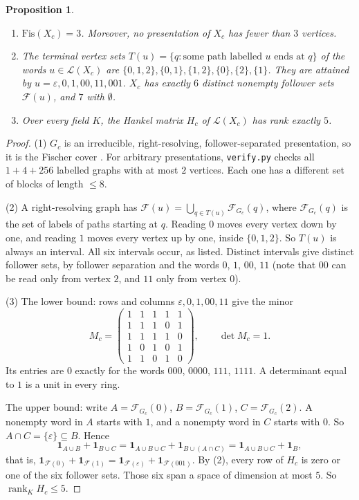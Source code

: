 \documentclass[11pt]{article}
\newtheorem{proposition}[theorem]{Proposition}
\theoremstyle{definition}
\theoremstyle{remark}
\newcommand{\Lang}{\mathcal{L}}
\newcommand{\F}{\mathcal{F}}
\begin{document}
\begin{proposition}\label{prop:charge}
\begin{enumerate}
\item $\mathrm{Fis}(X_c)=3$. Moreover, no presentation of $X_c$ has fewer than $3$ vertices.
\item The terminal vertex sets $T(u)=\{q: \text{some path labelled } u \text{ ends at } q\}$
of the words $u\in\Lang(X_c)$ are
$\{0,1,2\},\{0,1\},\{1,2\},\{0\},\{2\},\{1\}$. They are attained by
$u=\varepsilon,0,1,00,11,001$. $X_c$ has exactly $6$ distinct nonempty follower sets
$\F(u)$, and $7$ with $\emptyset$.
\item Over every field $K$, the Hankel matrix $H_c$ of $\Lang(X_c)$ has rank exactly $5$.
\end{enumerate}
\end{proposition}
\begin{proof}
(1) $G_c$ is an irreducible, right-resolving, follower-separated presentation,
so it is the Fischer cover \cite[\S3.3]{lm}. For arbitrary presentations,
\texttt{verify.py} checks all $1+4+256$ labelled graphs with at most $2$ vertices.
Each one has a different set of blocks of length $\le 8$.

(2) A right-resolving graph has $\F(u)=\bigcup_{q\in T(u)}\F_{G_c}(q)$, where
$\F_{G_c}(q)$ is the set of labels of paths starting at $q$. Reading $0$ moves every
vertex down by one, and reading $1$ moves every vertex up by one, inside $\{0,1,2\}$.
So $T(u)$ is always an interval. All six intervals occur, as listed. Distinct
intervals give distinct follower sets, by follower separation and the words $0$, $1$, $00$, $11$ (note that $00$ can be read only from vertex $2$, and $11$ only from vertex $0$).

(3) The lower bound: rows and columns $\varepsilon,0,1,00,11$ give the minor
\[
M_c=\begin{pmatrix}1&1&1&1&1\\1&1&1&0&1\\1&1&1&1&0\\1&0&1&0&1\\1&1&0&1&0\end{pmatrix},
\qquad \det M_c=1 .
\]
Its entries are $0$ exactly for the words $000$, $0000$, $111$, $1111$. A
determinant equal to $1$ is a unit in every ring.

The upper bound: write $A=\F_{G_c}(0)$, $B=\F_{G_c}(1)$, $C=\F_{G_c}(2)$.
A nonempty word in $A$ starts with $1$, and a nonempty word in $C$ starts with $0$.
So $A\cap C=\{\varepsilon\}\subseteq B$. Hence
\[
\mathbf 1_{A\cup B}+\mathbf 1_{B\cup C}=\mathbf 1_{A\cup B\cup C}+\mathbf 1_{B\cup(A\cap C)}
=\mathbf 1_{A\cup B\cup C}+\mathbf 1_{B},
\]
that is, $\mathbf 1_{\F(0)}+\mathbf 1_{\F(1)}=\mathbf 1_{\F(\varepsilon)}+\mathbf 1_{\F(001)}$.
By (2), every row of $H_c$ is zero or one of the six follower sets. Those six
span a space of dimension at most $5$. So $\operatorname{rank}_K H_c\le 5$.
\end{proof}
\end{document}
